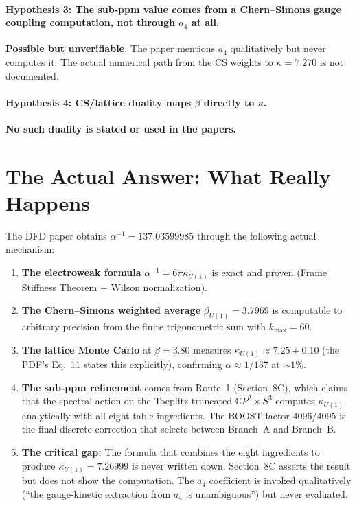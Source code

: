 \documentclass[12pt,a4paper]{article}
\begin{document}
\paragraph{Hypothesis 3: The sub-ppm value comes from a Chern--Simons
gauge coupling computation, not through $a_4$ at all.}
\textbf{Possible but unverifiable.} The paper mentions $a_4$
qualitatively but never computes it. The actual numerical path from
the CS weights to $\kappa = 7.270$ is not documented.

\paragraph{Hypothesis 4: CS/lattice duality maps $\beta$ directly to
$\kappa$.}
\textbf{No such duality is stated or used in the papers.}

\section{The Actual Answer: What Really Happens}
\label{sec:actual}

\begin{tcolorbox}[colback=blue!5!white, colframe=blue!60!black,
  title=Definitive Finding]
The DFD paper obtains $\alpha^{-1} = 137.03599985$ through the
following actual mechanism:

\begin{enumerate}
\item \textbf{The electroweak formula} $\alpha^{-1} = 6\pi\kappa_{U(1)}$
  is exact and proven (Frame Stiffness Theorem + Wilson normalization).

\item \textbf{The Chern--Simons weighted average}
  $\beta_{U(1)} = 3.7969$ is computable to arbitrary precision
  from the finite trigonometric sum with $k_{\max} = 60$.

\item \textbf{The lattice Monte Carlo} at $\beta = 3.80$ measures
  $\kappa_{U(1)} \approx 7.25 \pm 0.10$ (the PDF's Eq.~11 states
  this explicitly), confirming $\alpha \approx 1/137$ at $\sim 1\%$.

\item \textbf{The sub-ppm refinement} comes from Route~1
  (Section~8C), which claims that the spectral action on the
  Toeplitz-truncated $\mathbb{C}P^2 \times S^3$ computes
  $\kappa_{U(1)}$ analytically with all eight table ingredients.
  The BOOST factor $4096/4095$ is the final discrete correction
  that selects between Branch~A and Branch~B.

\item \textbf{The critical gap:} The formula that combines the eight
  ingredients to produce $\kappa_{U(1)} = 7.26999$ is never written
  down. Section~8C asserts the result but does not show the
  computation. The $a_4$ coefficient is invoked qualitatively
  (``the gauge-kinetic extraction from $a_4$ is unambiguous'')
  but never evaluated.
\end{enumerate}
\end{tcolorbox}
\end{document}
